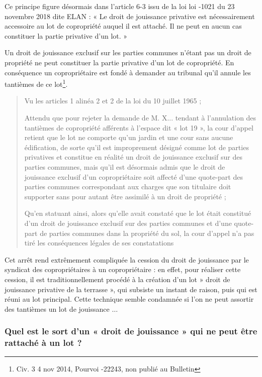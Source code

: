 			Ce principe figure désormais dans l’article 6-3 issu de la loi loi -1021 du 23 novembre 2018 dite
			ELAN : « Le droit de jouissance privative est nécessairement accessoire au lot de copropriété auquel il est
			attaché. Il ne peut en aucun cas constituer la partie privative d’un lot. »
		
			Un droit de jouissance exclusif sur les parties communes n'étant pas un droit de propriété ne peut
			constituer la partie privative d'un lot de copropriété. En conséquence un copropriétaire est fondé à
			demander au tribunal qu’il annule les tantièmes de ce lot\footnote{Civ. 3\degre{} 4 nov 2014, Pourvoi -22243, non publié au Bulletin}.
			\begin{quote}
				Vu les articles 1 alinéa 2 et 2 de la loi du 10 juillet 1965 ;
				 
				Attendu que pour rejeter la demande de M. X... tendant à l'annulation des tantièmes de copropriété afférents à
				l'espace dit « lot 19 », la cour d'appel retient que le lot  ne comporte qu'un jardin et une cour sans aucune
				édification, de sorte qu'il est improprement désigné comme lot de parties privatives et constitue en réalité un droit
				de jouissance exclusif sur des parties communes, mais qu'il est désormais admis que le droit de jouissance exclusif
				d'un copropriétaire soit affecté d'une quote-part des parties communes correspondant aux charges que son titulaire
				doit supporter sans pour autant être assimilé à un droit de propriété ;
				
				Qu'en statuant ainsi, alors qu'elle avait constaté que le lot  était constitué d'un droit de jouissance exclusif sur		des parties communes et d'une quote-part de parties communes dans la propriété du sol, la cour d'appel n'a pas tiré	les conséquences légales de ses constatations
			\end{quote}
			
			Cet arrêt rend extrêmement compliquée la cession du droit de jouissance par le syndicat des
			copropriétaires à un copropriétaire : en effet, pour réaliser cette cession, il est traditionnellement procédé
			à la création d’un lot » droit de jouissance privative de la terrasse », qui subsiste un instant de raison, puis
			qui est réuni au lot principal. Cette technique semble condamnée si l’on ne peut assortir des tantièmes un
			lot de jouissance $\dots$
		
		\subsubsection{Quel est le sort d’un « droit de jouissance » qui ne peut être rattaché à un lot ?}
		
